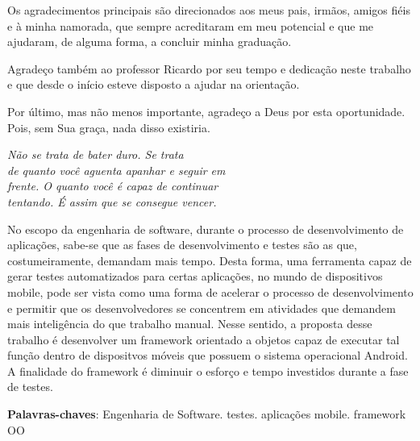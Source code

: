 \documentclass[
  12pt,       %
  openright,      %
  twoside,      %
  a4paper,      %
  english,      %
  french,       %
  spanish,      %
  brazil,       %
  ]{abntex2}
\begin{document}
\begin{agradecimentos}
Os agradecimentos principais são direcionados aos meus pais, irmãos,
amigos fiéis e à minha namorada, que sempre acreditaram em meu potencial
e que me ajudaram, de alguma forma, a concluir minha graduação.

Agradeço também ao professor Ricardo por seu tempo e dedicação neste trabalho e que desde o início esteve disposto a ajudar na orientação.

Por último, mas não menos importante, agradeço a Deus por esta oportunidade. Pois, sem Sua graça, nada disso existiria.

\end{agradecimentos}

\begin{epigrafe}
    \vspace*{\fill}
  \begin{flushright}
    \textit{Não se trata de bater duro. Se trata \\
     de quanto você aguenta apanhar e seguir em \\
     frente. O quanto você é capaz de continuar \\
     tentando. É assim que se consegue vencer.}
  \end{flushright}
\end{epigrafe}


\begin{resumo}
  No escopo da engenharia de software, durante o processo de desenvolvimento
 de aplicações, sabe-se que as fases de desenvolvimento e testes são as que,
 costumeiramente, demandam mais tempo. Desta forma, uma ferramenta capaz
 de gerar testes automatizados para certas aplicações, no mundo de
 dispositivos mobile, pode ser vista como uma forma de acelerar o processo de
 desenvolvimento e permitir que os desenvolvedores se concentrem em
 atividades que demandem mais inteligência do que trabalho manual. Nesse
 sentido, a proposta desse trabalho é desenvolver um framework orientado
 a objetos capaz de executar tal função dentro de dispositvos móveis
 que possuem o sistema operacional Android. A finalidade do framework é diminuir
 o esforço e tempo investidos durante a fase de testes.

 \vspace{\onelineskip}

 \noindent
 \textbf{Palavras-chaves}: Engenharia de Software. testes. aplicações mobile.
 framework OO
\end{resumo}
\end{document}
